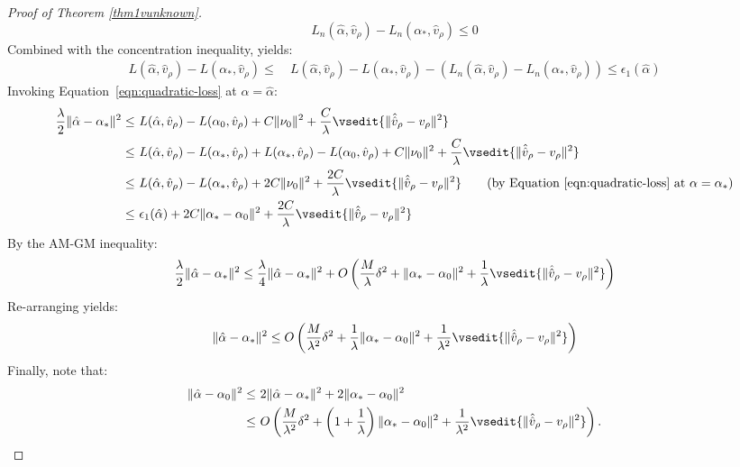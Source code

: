 \documentclass[aos]{imsart}
\numberwithin{equation}{section}
\theoremstyle{plain}
\theoremstyle{remark}
\begin{document}
\begin{appendix}
\begin{proof}[Proof of Theorem \ref{thm1vunknown}]
\begin{equation*}
L_{n}(\hat{\alpha}, \hat{v}_\rho)-L_{n}(\alpha_{\ast}, \hat{v}_\rho)\leq 0 %
\end{equation*}
Combined with the concentration inequality, yields:
\begin{align*}
    L(\hat{\alpha}, \hat{v}_\rho)-L(\alpha_{\ast}, \hat{v}_\rho) \leq~& L(\hat{\alpha}, \hat{v}_\rho)-L(\alpha_{\ast}, \hat{v}_\rho) - (L_{n}(\hat{\alpha}, \hat{v}_\rho)-L_{n}(\alpha_{\ast}, \hat{v}_\rho))\leq 
    \epsilon_{1}(\hat{\alpha})
\end{align*}
Invoking Equation~\eqref{eqn:quadratic-loss} at $\alpha=\hat{\alpha}$:
\begin{align}
    \frac{\lambda}{2} \|\hat{\alpha} - \alpha_{\ast}\|^2 \leq~& L(\hat{\alpha}, \hat{v}_\rho) - L(\alpha_0, \hat{v}_\rho) + C\|\nu_0\|^2 + \frac{C}{\lambda} \vsedit{\|\hat{\hat{v}}_\rho - v_\rho\|^2} \nonumber\\
    \leq~& L(\hat{\alpha}, \hat{v}_\rho) - L(\alpha_{\ast}, \hat{v}_\rho) + L(\alpha_{\ast},\hat{v}_\rho) - L(\alpha_0, \hat{v}_\rho) + C\|\nu_0\|^2 + \frac{C}{\lambda} \vsedit{\|\hat{\hat{v}}_\rho - v_\rho\|^2} \nonumber\\ 
    \leq~& L(\hat{\alpha}, \hat{v}_\rho) - L(\alpha_{\ast}, \hat{v}_\rho) + 2C\|\nu_0\|^2 + \frac{2C}{\lambda} \vsedit{\|\hat{\hat{v}}_\rho - v_\rho\|^2}\tag{by Equation~\eqref{eqn:quadratic-loss} at $\alpha=\alpha_{\ast}$}\\ 
    \leq~& \epsilon_1(\hat{\alpha}) + 2C\|\alpha_{\ast}-\alpha_0\|^2 + \frac{2C}{\lambda} \vsedit{\|\hat{\hat{v}}_\rho - v_\rho\|^2} \nonumber
\end{align}
By the AM-GM inequality:
\begin{align*}
    \frac{\lambda}{2} \|\hat{\alpha} - \alpha_{\ast}\|^2 \leq \frac{\lambda}{4} \|\hat{\alpha}-\alpha_{\ast}\|^2 + O\left(\frac{M}{\lambda} \delta^2 + \|\alpha_{\ast}-\alpha_0\|^2 + \frac{1}{\lambda} \vsedit{\|\hat{\hat{v}}_\rho - v_\rho\|^2}\right)
\end{align*}
Re-arranging yields:
\begin{align*}
    \|\hat{\alpha} - \alpha_{\ast}\|^2 \leq  O\left(\frac{M}{\lambda^2} \delta^2 + \frac{1}{\lambda}\|\alpha_{\ast}-\alpha_0\|^2 + \frac{1}{\lambda^2} \vsedit{\|\hat{\hat{v}}_\rho - v_\rho\|^2}\right)
\end{align*}
Finally, note that:
\begin{align*}
    \|\hat{\alpha}-\alpha_0\|^2 \leq~& 2\|\hat{\alpha}-\alpha_{\ast}\|^2 + 2 \|\alpha_{\ast}-\alpha_0\|^2\\
    \leq~& O\left(\frac{M}{\lambda^2} \delta^2 + \left(1 + \frac{1}{\lambda}\right)\|\alpha_{\ast}-\alpha_0\|^2 + \frac{1}{\lambda^2} \vsedit{\|\hat{\hat{v}}_\rho - v_\rho\|^2}\right). \qedhere
\end{align*}
\end{proof}


\end{appendix}
\end{document}
